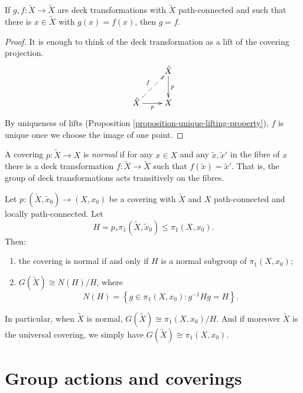 \begin{proposition}
\label{proposition-deck-agree-point}
If $g,f:\tilde{X}\to\tilde{X}$ are deck
transformations with $\tilde{X}$
path-connected and such that there is
$x\in\tilde{X}$ with $g(x)=f(x)$, then
$g=f$.
\end{proposition}

\begin{proof}
It is enough to think of the deck
transformation as a lift of the covering
projection.
$$
\xymatrix{
  & \tilde{X} \ar[d]^{p} \\
\tilde{X} \ar@{-->}[ur]^{f} \ar[r]_{p}
  & X
}
$$
By uniqueness of lifts
(Proposition
\ref{proposition-unique-lifting-property}),
$f$ is unique once we choose the image of
one point.
\end{proof}

\begin{definition}
\label{definition-normal-covering}
A covering $p:\tilde{X}\to X$ is {\it normal}
if for any $x\in X$ and any
$\tilde{x},\tilde{x}'$ in the fibre of $x$
there is a deck transformation
$f:\tilde{X}\to\tilde{X}$ such that
$f(\tilde{x})=\tilde{x}'$. That is, the
group of deck transformations acts
transitively on the fibres.
\end{definition}

\begin{proposition}
\label{proposition-deck-group-normalizer}
Let $p:(\tilde{X},\tilde{x}_0)\to(X,x_0)$
be a covering with $\tilde{X}$ and $X$
path-connected and locally path-connected.
Let
$$
H=p_*\pi_1(\tilde{X},\tilde{x}_0)
\leq\pi_1(X,x_0).
$$
Then:
\begin{enumerate}
\item the covering is normal if and only if
$H$ is a normal subgroup of $\pi_1(X,x_0)$;
\item $G(\tilde{X})\cong N(H)/H$, where
$$
N(H)=\left\{g\in\pi_1(X,x_0):
g^{-1}Hg=H\right\}.
$$
\end{enumerate}
In particular, when $\tilde{X}$ is normal,
$G(\tilde{X})\cong\pi_1(X,x_0)/H$. And if
moreover $\tilde{X}$ is the universal
covering, we simply have
$G(\tilde{X})\cong\pi_1(X,x_0)$.
\end{proposition}

\section{Group actions and coverings}
\label{section-group-actions-coverings}

